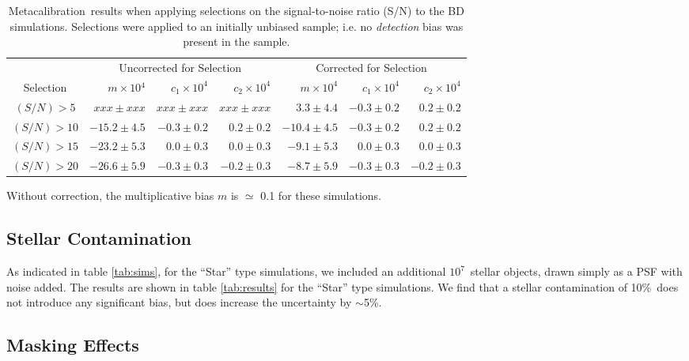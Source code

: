 \documentclass[usegraphicx,usenatbib]{mn2e}
\newcommand{\Mcal}{Metacalibration}
\newcommand{\nsimNstar}{$10^7$}
\newcommand{\nsimNstarperc}{10\%}
\begin{document}
\begin{table}
    \centering
    \caption{\Mcal\ results when applying selections on the signal-to-noise ratio (S/N) to the BD simulations. Selections
    were applied to an initially unbiased sample; i.e. no {\em detection}
    bias was present in the sample. \label{tab:selresults}}
    \begin{tabular}{ |c| r|r|r|  r|r|r|}
        \hline
        & \multicolumn{3}{c}{Uncorrected for Selection} & \multicolumn{3}{c}{Corrected for Selection} \\
        Selection & $m \times 10{^4} $ & $c_1 \times 10^4$ & $c_2 \times 10^4$ & $m \times 10^{4}$ & $c_1 \times 10^4$ & $c_2 \times 10^4$ \\
        \hline
        $(S/N) > 5$  & $xxx \pm xxx$ & $xxx \pm xxx$ & $xxx \pm xxx$ & $3.3 \pm 4.4$ & $-0.3 \pm 0.2$ & $0.2 \pm 0.2$  \\
        $(S/N) > 10$  & $-15.2 \pm 4.5$ & $-0.3 \pm 0.2$ & $0.2 \pm 0.2$ & $-10.4 \pm 4.5$ & $-0.3 \pm 0.2$ & $0.2 \pm 0.2$  \\
        $(S/N) > 15$  & $-23.2 \pm 5.3$ & $0.0 \pm 0.3$ & $0.0 \pm 0.3$ & $-9.1 \pm 5.3$ & $0.0 \pm 0.3$ & $0.0 \pm 0.3$  \\
        $(S/N) > 20$  & $-26.6 \pm 5.9$ & $-0.3 \pm 0.3$ & $-0.2\pm 0.3$ & $-8.7 \pm 5.9$ & $-0.3 \pm 0.3$ & $-0.2 \pm 0.3$  \\
    \end{tabular}
\end{table}


Without correction, the multiplicative bias $m$ is $\simeq$ 0.1
for these simulations.

\subsection{Stellar Contamination} \label{sec:stars}

As indicated in table \ref{tab:sims}, for the ``Star'' type simulations, we
included an additional \nsimNstar\ stellar objects, drawn simply as a PSF with
noise added.  The results are shown in table \ref{tab:results} for the ``Star''
type simulations.  We find that a stellar contamination of 
\nsimNstarperc\ does not introduce any significant bias, but does
increase the uncertainty by $\sim$5\%.

\subsection{Masking Effects} \label{sec:masking}
\end{document}
